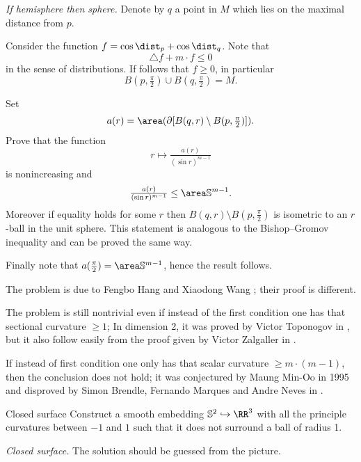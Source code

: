 \textit{If hemisphere then sphere.}
Denote by $q$ a point in $M$ which lies on the maximal distance from $p$.

Consider the function $f=\cos \dist_p+\cos\dist_q$.
Note that 
\[\triangle f+m\cdot f\le 0\] 
in the sense of distributions.
If follows that $f\ge 0$, in particular 
\[B(p,\tfrac\pi2)\cup B(q,\tfrac\pi2)=M.\]

Set \[a(r)=\area(\partial [B(q,r)\setminus B(p,\tfrac\pi2)]).\]
Prove that the function
\[r \mapsto \tfrac{a(r)}{(\sin r)^{m-1}}\]
is nonincreasing 
and 
\[\tfrac{a(r)}{(\sin r)^{m-1}}\le\area\mathbb{S}^{m-1}.\]
Moreover if equality holds for some $r$ then $B(q,r)\setminus B(p,\tfrac\pi2)$ is isometric to an $r$-ball in the unit sphere.
This statement is analogous to the Bishop--Gromov inequality and can be proved the same way.

Finally note that $a(\tfrac\pi2)=\area\mathbb{S}^{m-1}$,
hence the result follows.
 

The problem is due to Fengbo Hang %
and Xiaodong Wang %
\cite{hang-wang};
their proof is different.

The problem is still nontrivial 
even if instead of the first condition one has that sectional curvature $\ge 1$;
In dimension 2, 
it was proved by Victor Toponogov in \cite{toponogov},
but it also follow easily from the proof given by Victor Zalgaller in \cite{zalgaller-shperical-polygon}.


If instead of first condition one only has that scalar curvature $\ge m\cdot(m-1)$, then the conclusion does not hold; 
it was conjectured by Maung Min-Oo in 1995 
and disproved by
Simon Brendle,
Fernando Marques
and Andre Neves in \cite{brendle-marques-neve}.











\begin{pr}{}{Closed surface}\label{3D-moon-in-puddle}
Construct a smooth embedding $\mathbb{S}^2\hookrightarrow \RR^3$ 
with all the principle curvatures between $-1$ and $1$
such that it does not surround a ball of radius 1.
\end{pr}



\textit{Closed surface.}
The solution should be guessed from the picture.

